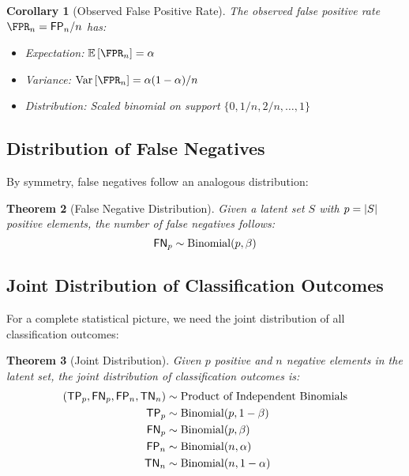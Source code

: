 \documentclass[11pt,final,hidelinks]{article}
\newtheorem{theorem}{Theorem}[section]
\newtheorem{corollary}[theorem]{Corollary}
\newcommand{\FP}{\mathsf{FP}}  %
\newcommand{\FN}{\mathsf{FN}}  %
\newcommand{\TP}{\mathsf{TP}}  %
\newcommand{\TN}{\mathsf{TN}}  %
\newcommand{\Binomial}[2]{\mathrm{Binomial}(#1, #2)}
\begin{document}
\begin{corollary}[Observed False Positive Rate]
The observed false positive rate $\FPR_n = \FP_n/n$ has:
\begin{itemize}
    \item Expectation: $\Expect{\FPR_n} = \fprate$
    \item Variance: $\Var{\FPR_n} = \fprate(1-\fprate)/n$
    \item Distribution: Scaled binomial on support $\{0, 1/n, 2/n, \ldots, 1\}$
\end{itemize}
\end{corollary}

\subsection{Distribution of False Negatives}

By symmetry, false negatives follow an analogous distribution:

\begin{theorem}[False Negative Distribution]
Given a latent set $S$ with $p = \lvert S\rvert$ positive elements, the number of false negatives follows:
\begin{equation}
\FN_p \sim \Binomial{p}{\fnrate}
\end{equation}
\end{theorem}

\subsection{Joint Distribution of Classification Outcomes}

For a complete statistical picture, we need the joint distribution of all classification outcomes:

\begin{theorem}[Joint Distribution]
Given $p$ positive and $n$ negative elements in the latent set, the joint distribution of classification outcomes is:
\begin{align}
(\TP_p, \FN_p, \FP_n, \TN_n) &\sim \text{Product of Independent Binomials} \\
\TP_p &\sim \Binomial{p}{1-\fnrate} \\
\FN_p &\sim \Binomial{p}{\fnrate} \\
\FP_n &\sim \Binomial{n}{\fprate} \\
\TN_n &\sim \Binomial{n}{1-\fprate}
\end{align}
\end{theorem}
\end{document}
